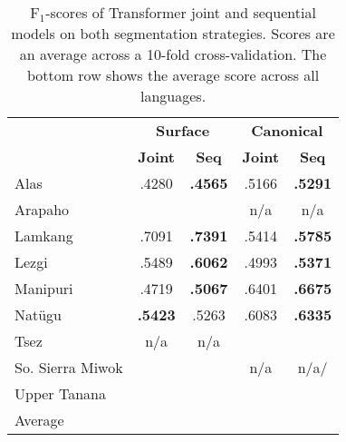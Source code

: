 \begin{table}[h!]
    \centering
    \begin{tabular}{l|cc|cc}
          & \multicolumn{2}{c|}{\textbf{Surface}} & \multicolumn{2}{c}{\textbf{Canonical}} \\
          &  \textbf{Joint} & \textbf{Seq} &  \textbf{Joint} & \textbf{Seq} \\
         \hline
         Alas & .4280 & \textbf{.4565} & .5166 & \textbf{.5291} \\
         \hline
         Arapaho &  &  & n/a & n/a \\
         \hline
         Lamkang & .7091 & \textbf{.7391} & .5414 & \textbf{.5785} \\
         \hline
         Lezgi & .5489 & \textbf{.6062} & .4993 & \textbf{.5371} \\
         \hline
         Manipuri & .4719 & \textbf{.5067} & .6401 & \textbf{.6675}\\
         \hline
         Natügu & \textbf{.5423} & .5263 & .6083 & \textbf{.6335 }\\
         \hline
         Tsez & n/a & n/a &  &  \\
         \hline
         So. Sierra Miwok &  &  & n/a & n/a/ \\
         \hline
         Upper Tanana &  &  &  &  \\
         \hline
         \hline
         Average &  &  &  & \\
    \end{tabular}
    \caption[Results of Transformer on Joint and Sequential models]{F$_1$-scores of Transformer joint and sequential models on both segmentation strategies. Scores are an average across a 10-fold cross-validation. The bottom row shows the average score across all languages.}
    \label{tab:allresults}
\end{table}

